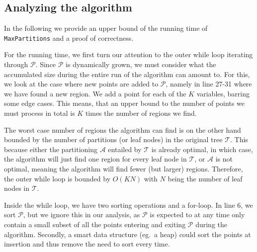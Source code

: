 \begin{algorithm}[!ht]
\begin{algorithmic}[1]
        \EndWhile%


    \end{algorithmic}

\end{algorithm}


\subsection{Analyzing the algorithm}%
\label{sub:maxPartsAnalysis}

In the following we provide an upper bound of the running time of
\texttt{MaxPartitions} and a proof of correctness.

For the running time, we first turn our attention to the outer while loop
iterating through $\mathcal{P}$. Since $\mathcal{P}$ is dynamically grown, we
must consider what the accumulated size during the entire run of the algorithm
can amount to. For this, we look at the case where new points are added to
$\mathcal{P}$, namely in line 27-31 where we have found a new region. We add a
point for each of the $K$ variables, barring some edge cases. This means, that
an upper bound to the number of points we must process in total is $K$ times the
number of regions we find.

The worst case number of regions the algorithm can find is on the other hand
bounded by the number of partitions (or leaf nodes) in the original tree
$\mathcal{T}$. This because either the partitioning $\mathcal{A}$ entailed by
$\mathcal{T}$ is already optimal, in which case, the algorithm will just find
one region for every leaf node in $\mathcal{T}$, or $\mathcal{A}$ is not
optimal, meaning the algorithm will find fewer (but larger) regions. Therefore,
the outer while loop is bounded by $O(KN)$ with $N$ being the number of leaf
nodes in $\mathcal{T}$.

Inside the while loop, we have two sorting operations and a for-loop. In line 6,
we sort $\mathcal{P}$, but we ignore this in our analysis, as $\mathcal{P}$ is
expected to at any time only contain a small subset of all the points entering
and exiting $\mathcal{P}$ during the algorithm. Secondly, a smart data structure
(eg.\ a heap) could sort the points at insertion and thus remove the need to
sort every time.


